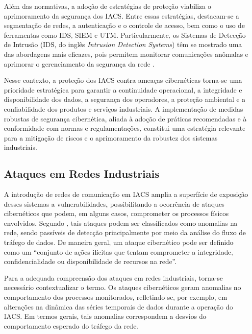     Além das normativas, a adoção de estratégias de proteção viabiliza o aprimoramento da segurança dos IACS. Entre essas estratégias, destacam-se a segmentação de redes, a autenticação e o controle de acesso, bem como o uso de ferramentas como IDS, SIEM e UTM. Particularmente, os Sistemas de Detecção de Intrusão (IDS, do inglês \textit{Intrusion Detection Systems}) têm se mostrado uma das abordagens mais eficazes, pois permitem monitorar comunicações anômalas e aprimorar o gerenciamento da segurança da rede \cite{shi2021}. 

    Nesse contexto, a proteção dos IACS contra ameaças cibernéticas torna-se uma prioridade estratégica para garantir a continuidade operacional, a integridade e disponibilidade dos dados, a segurança dos operadores, a proteção ambiental e a confiabilidade dos produtos e serviços industriais. A implementação de medidas robustas de segurança cibernética, aliada à adoção de práticas recomendadas e à conformidade com normas e regulamentações, constitui uma estratégia relevante para a mitigação de riscos e o aprimoramento da robustez dos sistemas industriais. %

    \subsection{Ataques em Redes Industriais} \label{subsec:tiposAtaques}

        A introdução de redes de comunicação em IACS amplia a superfície de exposição desses sistemas a vulnerabilidades, possibilitando a ocorrência de ataques cibernéticos que podem, em alguns casos, comprometer os processos físicos envolvidos. Segundo , tais ataques podem ser classificados como anomalias na rede, sendo passíveis de detecção principalmente por meio da análise do fluxo de tráfego de dados. De maneira geral, um ataque cibernético pode ser definido como um ``conjunto de ações ilícitas que tentam comprometer a integridade, confidencialidade ou disponibilidade de recursos na rede''. 

        Para a adequada compreensão dos ataques em redes industriais, torna-se necessário contextualizar o termo. Os ataques cibernéticos geram anomalias no comportamento dos processos monitorados, refletindo-se, por exemplo, em alterações na dinâmica das séries temporais de dados durante a operação do IACS. Em termos gerais, tais anomalias correspondem a desvios do comportamento esperado do tráfego da rede.
        
